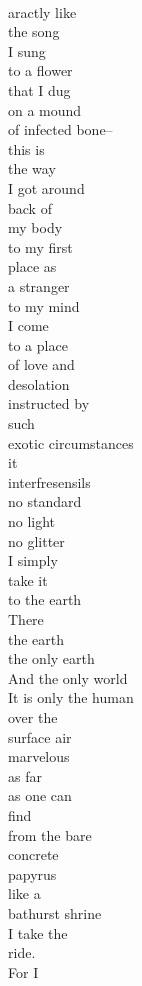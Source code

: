 \documentclass[smalldemyvopaper,11pt,twoside,onecolumn,openright,extrafontsizes]{memoir}
\begin{document}
\\aractly like
\\the song
\\I sung
\\to a flower
\\that I dug
\\on a mound
\\of infected bone--
\\this is
\\the way
\\I got around
\\back of
\\my body
\\to my first
\\place as
\\a stranger
\\to my mind
\\I come
\\to a place
\\of love and
\\desolation
\\instructed by
\\such
\\exotic circumstances
\\it
\\interfresensils
\\no standard
\\no light
\\no glitter
\\I simply
\\take it
\\to the earth
\\There
\\the earth
\\the only earth
\\And the only world
\\It is only the human
\\over the
\\surface air
\\marvelous
\\as far
\\as one can
\\find
\\from the bare
\\concrete
\\papyrus
\\like a
\\bathurst shrine
\\I take the
\\ride.
\\For I
\end{document}
